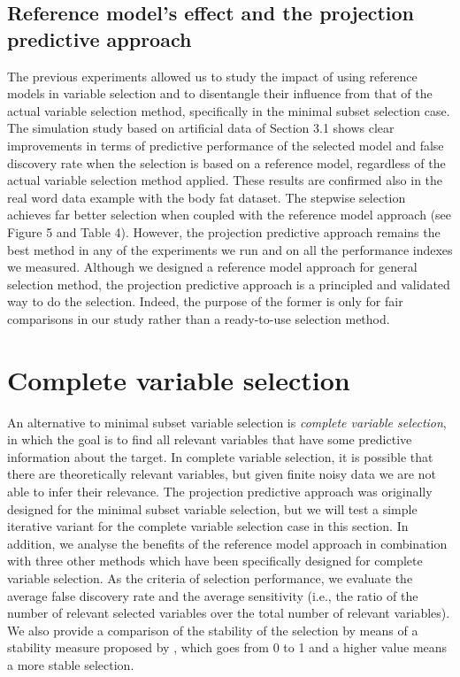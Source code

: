 \documentclass[a4]{article}
\let\rmarkdownfootnote\footnote%
\def\footnote{\protect\rmarkdownfootnote}
\theoremstyle{definition}
\begin{document}
\subsection{Reference model's effect and the projection predictive approach}
The previous experiments allowed us to study the impact of using reference models in variable selection and to disentangle their influence from that of the actual variable selection method, specifically in the minimal subset selection case.
The simulation study based on artificial data of Section 3.1 shows clear improvements in terms of predictive performance of the selected model and false discovery rate when the selection is based on a reference model, regardless of the actual variable selection method applied. These results are confirmed also in the real word data example with the body fat dataset. The stepwise selection achieves far better selection when coupled with the reference model approach (see Figure 5 and Table 4). However, the projection predictive approach remains the best method in any of the experiments we run and on all the performance indexes we measured. Although we designed a reference model approach for general selection method, the projection predictive approach is a principled and validated way to do the selection. Indeed, the purpose of the former is only for fair comparisons in our study rather than a ready-to-use selection method.

\section{Complete variable selection}\label{comparison-complete-subset}
\label{complete-selection}

An alternative to minimal subset variable selection is \emph{complete
  variable selection}, in which the goal is to find all relevant
variables that have some predictive information about the target. In
complete variable selection, it is possible that there are theoretically
relevant variables, but given finite noisy data we are not able to infer their relevance.
The projection predictive approach was originally designed for the minimal subset
variable selection, but we will test a simple iterative variant for the complete
variable selection case in this section.
 In addition, we analyse the benefits of the reference
model approach in combination with three other
methods which have been specifically designed for complete variable selection. 
As the criteria of selection performance, we evaluate the average false
discovery rate and the average
sensitivity (i.e., the ratio of the number of relevant selected
variables over the total number of relevant variables). We also provide
a comparison of the stability of the selection by means of a stability
measure proposed by \citet{paper:stability}, which goes from 0 to 1 and a higher value 
means a more stable selection. 
%
\end{document}
